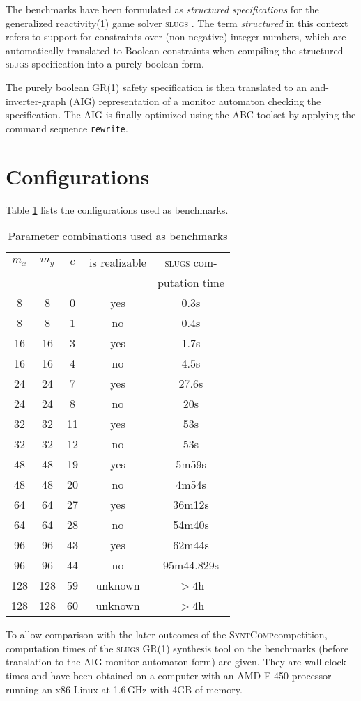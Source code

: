 \documentclass[a4paper,conference,10pt]{IEEEtran}
\newcommand{\SyntComp}{\textsc{SyntComp}}
\begin{document}
\noindent The benchmarks have been formulated as \emph{structured specifications} for the generalized reactivity(1) game solver \textsc{slugs} \cite{SlugsReference}. The term \emph{structured} in this context refers to support for constraints over (non-negative) integer numbers, which are automatically translated to Boolean constraints when compiling the structured \textsc{slugs} specification into a purely boolean form.

The purely boolean GR(1) safety specification is then translated to an and-inverter-graph (AIG) representation of a monitor automaton checking the specification. The AIG is finally optimized using the ABC toolset \cite{ABCTool} by applying the command sequence \texttt{rewrite}.


\section{Configurations}

\noindent Table \ref{tab:benchmarks} lists the configurations used as benchmarks.
%
\begin{table}[b]
\normalsize
\begin{center}
\begin{tabular}{c|c|c||c|c}
$m_x$ & $m_y$ & $c$ & is realizable & \textsc{slugs} com- \\ & & & & putation time\\ \hline \hline
8 & 8 & 0 & yes & 0.3s \\ \hline
8 & 8 & 1 & no & 0.4s \\ \hline
16 & 16 & 3 & yes & 1.7s \\ \hline
16 & 16 & 4 & no & 4.5s \\ \hline
24 & 24 & 7 & yes & 27.6s\\ \hline
24 & 24 & 8 & no & 20s \\ \hline
32 & 32 & 11 & yes & 53s \\ \hline
32 & 32 & 12 & no & 53s \\ \hline
48 & 48 & 19 & yes & 5m59s \\ \hline
48 & 48 & 20 & no & 4m54s \\ \hline
64 & 64 & 27 & yes & 36m12s   \\ \hline
64 & 64 & 28 & no & 54m40s   \\ \hline
96 & 96 & 43 & yes & 62m44s  \\ \hline
96 & 96 & 44 & no & 95m44.829s  \\ \hline
128 & 128 & 59 & unknown & $> 4$h   \\ \hline
128 & 128 & 60 & unknown & $> 4$h   \\ 

\end{tabular}
\end{center}
\caption{Parameter combinations used as benchmarks}
\label{tab:benchmarks}
\end{table}
%
To allow comparison with the later outcomes of the \SyntComp competition, computation times of the \textsc{slugs} GR(1) synthesis tool on the benchmarks (before translation to the AIG monitor automaton form) are given. They are wall-clock times and have been obtained on a computer with an AMD E-450 processor running an x86 Linux at 1.6\,GHz with 4GB of memory.
\end{document}
